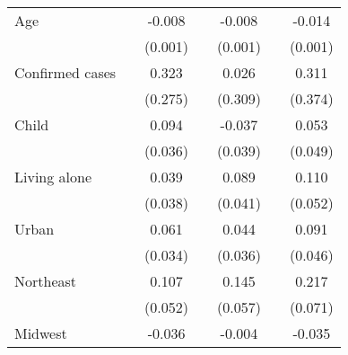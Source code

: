 {\begin{tabular}{l*{6}{c}}
\addlinespace
Age                 &                     &      -0.008\sym{***}&                     &      -0.008\sym{***}&                     &      -0.014\sym{***}\\
                    &                     &     (0.001)         &                     &     (0.001)         &                     &     (0.001)         \\
\addlinespace
Confirmed cases     &                     &       0.323         &                     &       0.026         &                     &       0.311         \\
                    &                     &     (0.275)         &                     &     (0.309)         &                     &     (0.374)         \\
\addlinespace
Child               &                     &       0.094\sym{***}&                     &      -0.037         &                     &       0.053         \\
                    &                     &     (0.036)         &                     &     (0.039)         &                     &     (0.049)         \\
\addlinespace
Living alone        &                     &       0.039         &                     &       0.089\sym{**} &                     &       0.110\sym{**} \\
                    &                     &     (0.038)         &                     &     (0.041)         &                     &     (0.052)         \\
\addlinespace
Urban               &                     &       0.061\sym{*}  &                     &       0.044         &                     &       0.091\sym{**} \\
                    &                     &     (0.034)         &                     &     (0.036)         &                     &     (0.046)         \\
\addlinespace
Northeast           &                     &       0.107\sym{**} &                     &       0.145\sym{**} &                     &       0.217\sym{***}\\
                    &                     &     (0.052)         &                     &     (0.057)         &                     &     (0.071)         \\
\addlinespace
Midwest             &                     &      -0.036         &                     &      -0.004         &                     &      -0.035         \\

\end{tabular}}
